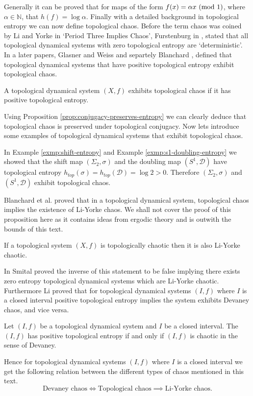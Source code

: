 Generally it can be proved that for maps of the form $f(x) = \alpha x \ (\mathrm{mod}\ 1)$, where $\alpha \in \mathbb{N}$, that $h(f) = \log \alpha$. Finally with a detailed background in topological entropy we can now define topological chaos. Before the term chaos was coined by Li and Yorke in `Period Three Implies Chaos', Furstenburg in \cite{furstenberg}, stated that all topological dynamical systems with zero topological entropy are `deterministic'. In a later papers, Glasner and Weiss \cite{glasner-weiss} and separtely Blanchard \cite{blanchard}, defined that topological dynamical systems that have positive topological entropy exhibit topological chaos.

\begin{defn}
    A topological dynamical system $(X, f)$ exhibits topological chaos if it has positive topological entropy.
\end{defn}

Using Proposition \ref{prop:conjugacy-preserves-entropy} we can clearly deduce that topological chaos is preserved under topological conjugacy. Now lets introduce some examples of topological dynamical systems that exhibit topological chaos.

\begin{exmp}
    In Example \ref{exmp:shift-entropy} and Example \ref{exmp:s1-doubling-entropy} we showed that the shift map $(\Sigma_2, \sigma)$ and the doubling map $(S^1, \mathcal{D})$ have topological entropy $h_{top}(\sigma) = h_{top}(\mathcal{D}) = \log 2 > 0$. Therefore $(\Sigma_2, \sigma)$ and $(S^1, \mathcal{D})$ exhibit topological chaos.
\end{exmp}

Blanchard et al. \cite{bgsm} proved that in a topological dynamical system, topological chaos implies the existence of Li-Yorke chaos. We shall not cover the proof of this proposition here as it contains ideas from ergodic theory and is outwith the bounds of this text.

\begin{prop}
    If a topological system $(X, f)$ is topologically chaotic then it is also Li-Yorke chaotic.
\end{prop}

In \cite{smital} Smital proved the inverse of this statement to be false implying there exists zero entropy topological dynamical systems which are Li-Yorke chaotic. Furthermore Li \cite{li} proved that for topological dynamical systems $(I, f)$ where $I$ is a closed interval positive topological entropy implies the system exhibits Devaney chaos, and vice versa.

\begin{prop}
    Let $(I, f)$ be a topological dynamical system and $I$ be a closed interval. The $(I, f)$ has positive topological entropy if and only if $(I, f)$ is chaotic in the sense of Devaney.
\end{prop}

Hence for topological dynamical systems $(I, f)$ where $I$ is a closed interval we get the following relation between the different types of chaos mentioned in this text. \[\text{Devaney chaos} \iff \text{Topological chaos} \implies\text{Li-Yorke chaos}.\]